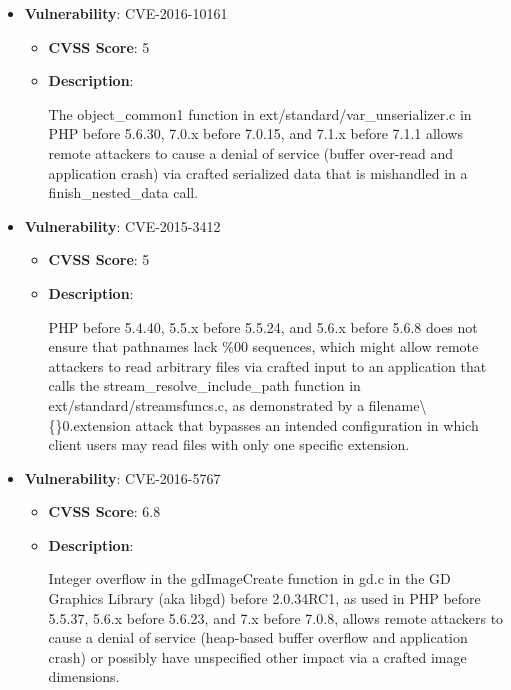 \documentclass{article}
\begin{document}
\begin{itemize}
        \item \textbf{Vulnerability}: CVE-2016-10161
        \begin{itemize}
            \item \textbf{CVSS Score}:  5 
            \item \textbf{Description}:
            \parbox[t]{0.9\linewidth}{
                \ttfamily The object\_common1 function in ext/standard/var\_unserializer.c in PHP before 5.6.30, 7.0.x before 7.0.15, and 7.1.x before 7.1.1 allows remote attackers to cause a denial of service (buffer over-read and application crash) via crafted serialized data that is mishandled in a finish\_nested\_data call.
            }
        \end{itemize}
    
        \item \textbf{Vulnerability}: CVE-2015-3412
        \begin{itemize}
            \item \textbf{CVSS Score}:  5 
            \item \textbf{Description}:
            \parbox[t]{0.9\linewidth}{
                \ttfamily PHP before 5.4.40, 5.5.x before 5.5.24, and 5.6.x before 5.6.8 does not ensure that pathnames lack \%00 sequences, which might allow remote attackers to read arbitrary files via crafted input to an application that calls the stream\_resolve\_include\_path function in ext/standard/streamsfuncs.c, as demonstrated by a filename\textbackslash\{\}0.extension attack that bypasses an intended configuration in which client users may read files with only one specific extension.
            }
        \end{itemize}
    
        \item \textbf{Vulnerability}: CVE-2016-5767
        \begin{itemize}
            \item \textbf{CVSS Score}:  6.8 
            \item \textbf{Description}:
            \parbox[t]{0.9\linewidth}{
                \ttfamily Integer overflow in the gdImageCreate function in gd.c in the GD Graphics Library (aka libgd) before 2.0.34RC1, as used in PHP before 5.5.37, 5.6.x before 5.6.23, and 7.x before 7.0.8, allows remote attackers to cause a denial of service (heap-based buffer overflow and application crash) or possibly have unspecified other impact via a crafted image dimensions.
            }
        \end{itemize}
    

\end{itemize}
\end{document}
